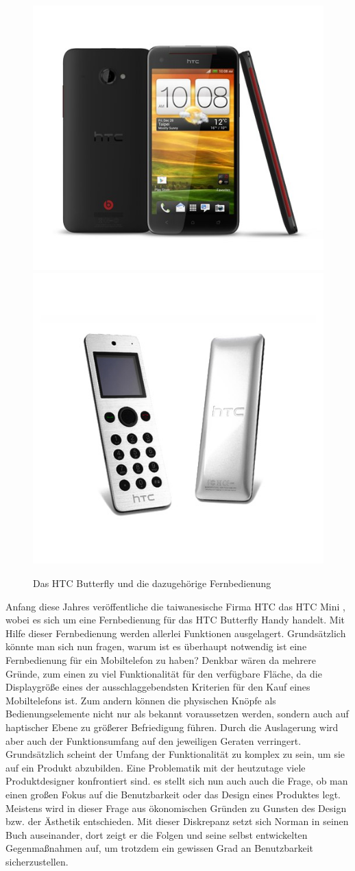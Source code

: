 \documentclass[parskip,headsepline, headtopline, %
footsepline, oneside, 12pt, headings=small]{scrreprt}
\begin{document}
\begin{figure}
\center
\includegraphics[width=.4\textwidth]{images/HTC-Butterfly}
\includegraphics[width=.4\textwidth]{images/htc-mini-fernbedienung}
\caption{Das HTC Butterfly und die dazugehörige Fernbedienung}
\label{fig:htc}
\end{figure}

Anfang diese Jahres veröffentliche die taiwanesische Firma HTC das HTC Mini \cite{htc}, wobei es sich um eine Fernbedienung für das HTC Butterfly Handy handelt. Mit Hilfe dieser Fernbedienung werden allerlei Funktionen ausgelagert. Grundsätzlich könnte man sich nun fragen, warum ist es überhaupt notwendig ist eine Fernbedienung für ein Mobiltelefon zu haben? Denkbar wären da mehrere Gründe, zum einen zu viel Funktionalität für den verfügbare Fläche, da die Displaygröße eines der ausschlaggebendsten Kriterien für den Kauf eines Mobiltelefons ist. Zum andern können die physischen Knöpfe als Bedienungselemente nicht nur als bekannt voraussetzen werden, sondern auch auf haptischer Ebene zu größerer Befriedigung führen. Durch die Auslagerung wird aber auch der Funktionsumfang auf den jeweiligen Geraten verringert.
Grundsätzlich scheint der Umfang der Funktionalität zu komplex zu sein, um sie auf ein Produkt abzubilden. Eine Problematik mit der heutzutage viele Produktdesigner konfrontiert sind. es stellt sich nun auch auch die Frage, ob man einen großen Fokus auf die Benutzbarkeit oder das Design eines Produktes legt. Meistens wird in dieser Frage aus ökonomischen Gründen zu Gunsten des Design bzw. der Ästhetik entschieden.
Mit dieser Diskrepanz setzt sich Norman in seinen Buch auseinander, dort zeigt er die Folgen und  seine selbst entwickelten Gegenmaßnahmen auf, um trotzdem ein gewissen Grad an Benutzbarkeit sicherzustellen.
\end{document}
